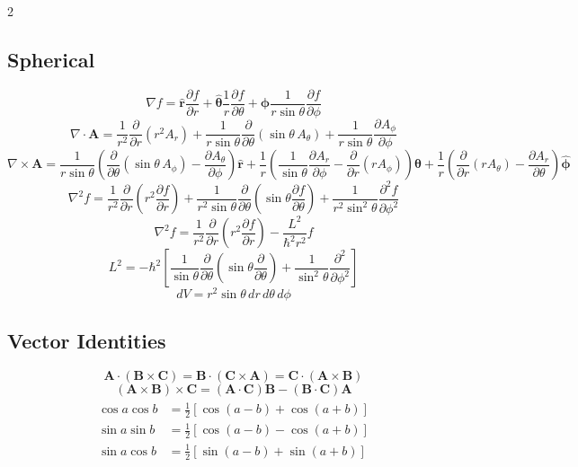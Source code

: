 \documentclass[9pt,a4paper]{article} %
\newcommand{\bs}[1]{\symbf{#1}}\usepackage{empheq}   %
\begin{document}
\begin{multicols}{2}
\subsection{Spherical}
\[\nabla f =
\hat{\mathbf{r}} \frac{\partial f}{\partial r}
+
\hat{\bs{\theta}} \frac{1}{r} \frac{\partial f}{\partial \theta}
+
\hat{\bs{\phi}} \frac{1}{r \sin\theta} \frac{\partial f}{\partial \phi}
\]
\[
\nabla \cdot \mathbf{A}
=
\frac{1}{r^2}\frac{\partial}{\partial r}\!\left(r^2 A_r\right)
+
\frac{1}{r\sin\theta}
\frac{\partial}{\partial \theta}\!\left(\sin\theta\, A_\theta\right)
+
\frac{1}{r\sin\theta}
\frac{\partial A_\phi}{\partial \phi}
\]
{\scriptsize\[
\nabla \times \mathbf{A}
=
\frac{1}{r\sin\theta}
\left(
\frac{\partial}{\partial \theta}(\sin\theta\, A_\phi)
-
\frac{\partial A_\theta}{\partial \phi}
\right)\hat{\mathbf{r}}
+
\frac{1}{r}
\left(
\frac{1}{\sin\theta}\frac{\partial A_r}{\partial \phi}
-
\frac{\partial}{\partial r}(r A_\phi)
\right)\hat{\bs{\theta}}
+
\frac{1}{r}
\left(
\frac{\partial}{\partial r}(r A_\theta)
-
\frac{\partial A_r}{\partial \theta}
\right)\hat{\bs{\phi}}
\]
}
\[\nabla^2 f = \frac{1}{r^2} \frac{\partial}{\partial r} \left( r^2 \frac{\partial f}{\partial r} \right) + \frac{1}{r^2 \sin\theta} \frac{\partial}{\partial \theta} \left( \sin\theta \frac{\partial f}{\partial \theta} \right) + \frac{1}{r^2 \sin^2\theta} \frac{\partial^2 f}{\partial \phi^2}\]
\[\nabla^2 f = \frac{1}{r^2} \frac{\partial}{\partial r} \left( r^2 \frac{\partial f}{\partial r} \right) - \frac{L^2}{\hbar^2 r^2} f\]
\[L^2 = -\hbar^2 \left[ \frac{1}{\sin\theta} \frac{\partial}{\partial \theta} \left( \sin\theta \frac{\partial}{\partial \theta} \right) + \frac{1}{\sin^2\theta} \frac{\partial^2}{\partial \phi^2} \right]\]
    \[
        dV = r^2 \sin\theta \, dr \, d\theta \, d\phi
    \]

\subsection{Vector Identities}
\[
\mathbf{A} \cdot (\mathbf{B} \times \mathbf{C}) = \mathbf{B} \cdot (\mathbf{C} \times \mathbf{A}) = \mathbf{C} \cdot (\mathbf{A} \times \mathbf{B})
\]
\[
(\mathbf{A} \times \mathbf{B}) \times \mathbf{C} = (\mathbf{A} \cdot \mathbf{C}) \mathbf{B} - (\mathbf{B} \cdot \mathbf{C}) \mathbf{A}
\]
\begin{align*}
    \begin{aligned}
\cos a \cos b &= \tfrac{1}{2}[\cos(a-b)+\cos(a+b)] \\
\sin a \sin b &= \tfrac{1}{2}[\cos(a-b)-\cos(a+b)] \\
\sin a \cos b &= \tfrac{1}{2}[\sin(a-b)+\sin(a+b)]
\end{aligned}
\end{align*}

\end{multicols}
\end{document}

